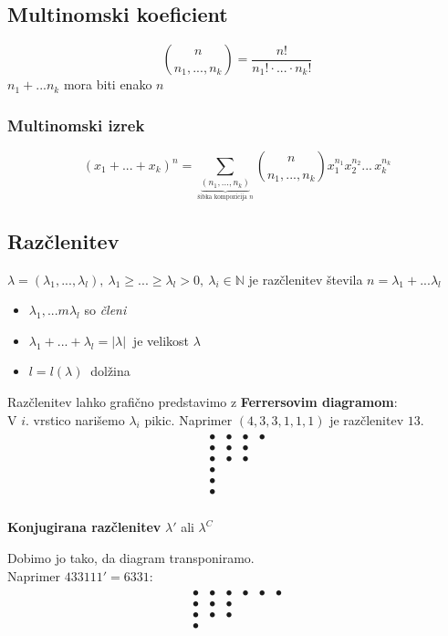 \documentclass[11pt,a4paper]{article}
\begin{document}
\subsection*{Multinomski koeficient}
\[\binom{n}{n_1, ..., n_k} = \frac{n!}{n_1!\cdot ... \cdot n_k!}\]
$n_1 + ... n_k$ mora biti enako $n$

\subsubsection*{Multinomski izrek}
\[(x_1 + ... + x_k)^n = \sum_{\underbrace{(n_1, ..., n_k)}_{\text{šibka kompozicija $n$}}} \binom{n}{n_1, ..., n_k} x_1^{n_1} x_2^{n_2} ...\, x_k^{n_k} \]

\subsection*{Razčlenitev}
$\lambda = (\lambda_1, ..., \lambda_l),\ \lambda_1 \geq ... \geq \lambda_l > 0,\ \lambda_i \in \mathbb{N}$ je razčlenitev števila $n = \lambda_1 + ... \lambda_l$

\begin{itemize}
    \item $\lambda_1, ...m \lambda_l$ so \emph{členi}
    \item $\lambda_1 + ... + \lambda_l = |\lambda|\ $ je velikost $\lambda$ 
    \item $l = l(\lambda)\ $ dolžina
\end{itemize}

Razčlenitev lahko grafično predstavimo z \textbf{Ferrersovim diagramom}:\\
V $i$. vrstico narišemo $\lambda_i$ pikic.
Naprimer $(4,3,3,1,1,1)$ je razčlenitev $13$.
\begin{align*}
    \begin{matrix}
        \bullet & \bullet & \bullet & \bullet \\
        \bullet & \bullet & \bullet  \\
        \bullet & \bullet & \bullet  \\
        \bullet \\
        \bullet \\
        \bullet \\
    \end{matrix}
\end{align*}

\textbf{Konjugirana razčlenitev} $\lambda'$ ali $\lambda^C$

Dobimo jo tako, da diagram transponiramo.\\
Naprimer $433111' = 6331$:
\begin{align*}
    \begin{matrix}
        \bullet & \bullet & \bullet & \bullet & \bullet & \bullet \\
        \bullet & \bullet & \bullet  \\
        \bullet & \bullet & \bullet  \\
        \bullet \\
    \end{matrix}
\end{align*}
\end{document}
